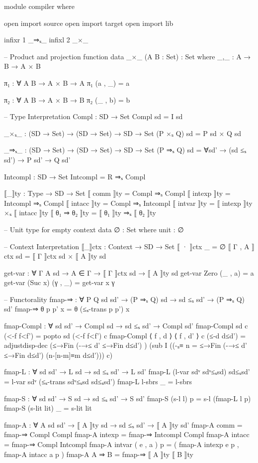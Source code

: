 \documentclass{article}
\begin{document}
\begin{prev}
\begin{code}
module compiler where

open import source
open import target
open import lib


infixr 1 _⇒ₛ_ 
infixl 2 _×_

-- Product and projection function
data _×_ (A B : Set) : Set where
    _,_ : A → B → A × B

π₁ : ∀ {A B} → A × B → A
π₁ (a , _) = a

π₂ : ∀ {A B} → A × B → B
π₂ (_ , b) = b

--  Type Interpretation
Compl : SD → Set
Compl sd = I sd

_×ₛ_ : (SD → Set) → (SD → Set) → SD → Set
(P ×ₛ Q) sd = P sd × Q sd

_⇒ₛ_ : (SD → Set) → (SD → Set) → SD → Set
(P ⇒ₛ Q) sd = ∀{sd'} → (sd ≤ₛ sd') → P sd' → Q sd' 

Intcompl : SD → Set
Intcompl = R ⇒ₛ Compl


⟦_⟧ty : Type → SD → Set
⟦ comm ⟧ty = Compl ⇒ₛ Compl
⟦ intexp ⟧ty = Intcompl ⇒ₛ Compl
⟦ intacc ⟧ty = Compl ⇒ₛ Intcompl
⟦ intvar ⟧ty = ⟦ intexp ⟧ty ×ₛ ⟦ intacc ⟧ty
⟦ θ₁ ⇒ θ₂ ⟧ty = ⟦ θ₁ ⟧ty ⇒ₛ ⟦ θ₂ ⟧ty

-- Unit type for empty context
data ∅ : Set where
    unit : ∅

-- Context Interpretation
⟦_⟧ctx : Context → SD → Set
⟦ · ⟧ctx _ = ∅
⟦ Γ , A ⟧ctx sd = ⟦ Γ ⟧ctx sd × ⟦ A ⟧ty sd

get-var : ∀ {Γ A sd} → A ∈ Γ → ⟦ Γ ⟧ctx sd → ⟦ A ⟧ty sd
get-var Zero     (_ , a) = a
get-var (Suc x) (γ , _) = get-var x γ

-- Functorality
fmap-⇒ : ∀ {P Q sd sd'} → (P ⇒ₛ Q) sd → sd ≤ₛ sd' → (P ⇒ₛ Q) sd'
fmap-⇒ θ p p' x = θ (≤ₛ-trans p p') x


fmap-Compl : ∀ {sd sd'} → Compl sd → sd ≤ₛ sd' → Compl sd'
fmap-Compl {sd} c (<-f f<f') = popto sd (<-f f<f') c
fmap-Compl {⟨ f , d ⟩} {⟨ f , d' ⟩} c (≤-d d≤d') = 
    adjustdisp-dec (≤→Fin (-→≤ {d'} {≤→Fin d≤d'}) ) (sub I ((-ₛ≡ {n = ≤→Fin (-→≤ {d'} {≤→Fin d≤d'})} (n-[n-m]≡m d≤d'))) c)


fmap-L : ∀ {sd sd'} → L sd → sd ≤ₛ sd' → L sd'
fmap-L (l-var sdᵛ sdᵛ≤ₛsd) sd≤ₛsd' = l-var sdᵛ (≤ₛ-trans sdᵛ≤ₛsd sd≤ₛsd') 
fmap-L l-sbrs _ = l-sbrs


fmap-S : ∀ {sd sd'} → S sd → sd ≤ₛ sd' → S sd'
fmap-S (s-l l) p = s-l (fmap-L l p)
fmap-S (s-lit lit) _ = s-lit lit


fmap-A : ∀ {A sd sd'} → ⟦ A ⟧ty sd → sd ≤ₛ sd' → ⟦ A ⟧ty sd'
fmap-A {comm}  = fmap-⇒ {Compl} {Compl}
fmap-A {intexp} = fmap-⇒ {Intcompl} {Compl}
fmap-A {intacc} = fmap-⇒ {Compl} {Intcompl}
fmap-A {intvar} ( e , a ) p = ( fmap-A {intexp} e p , fmap-A {intacc} a p )
fmap-A {A ⇒ B} = fmap-⇒ {⟦ A ⟧ty} {⟦ B ⟧ty}


\end{code}
\end{prev}
\end{document}
